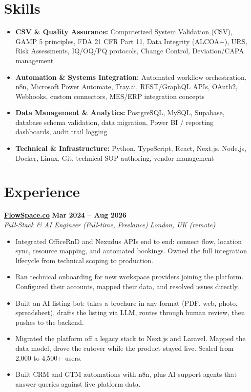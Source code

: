 \documentclass[a4paper,10pt]{article}
\newcommand{\role}[4]{%
 \textbf{#1} \hfill \textbf{#2}\\[1pt]%
 \textit{#3} \hfill \textit{#4}\\[2pt]%
}
\begin{document}
\section{Skills}
\begin{itemize}
 \item \textbf{CSV \& Quality Assurance:} Computerized System Validation (CSV), GAMP 5 principles, FDA 21 CFR Part 11, Data Integrity (ALCOA+), URS, Risk Assessments, IQ/OQ/PQ protocols, Change Control, Deviation/CAPA management
 \item \textbf{Automation \& Systems Integration:} Automated workflow orchestration, n8n, Microsoft Power Automate, Tray.ai, REST/GraphQL APIs, OAuth2, Webhooks, custom connectors, MES/ERP integration concepts
 \item \textbf{Data Management \& Analytics:} PostgreSQL, MySQL, Supabase, database schema validation, data migration, Power BI / reporting dashboards, audit trail logging
 \item \textbf{Technical \& Infrastructure:} Python, TypeScript, React, Next.js, Node.js, Docker, Linux, Git, technical SOP authoring, vendor management
\end{itemize}

\section{Experience}

\role{\href{https://flowspace.co}{FlowSpace.co}}{Mar 2024 -- Aug 2026}{Full-Stack \& AI Engineer (Full-time, Freelance)}{London, UK (remote)}
\begin{itemize}
 \item Integrated OfficeRnD and Nexudus APIs end to end: connect flow, location sync, resource mapping, and automated bookings. Owned the full integration lifecycle from technical scoping to production.
 \item Ran technical onboarding for new workspace providers joining the platform. Configured their accounts, mapped their data, and resolved issues directly.
 \item Built an AI listing bot: takes a brochure in any format (PDF, web, photo, spreadsheet), drafts the listing via LLM, routes through human review, then pushes to the backend.
 \item Migrated the platform off a legacy stack to Next.js and Laravel. Mapped the data model, drove the cutover while the product stayed live. Scaled from 2,000 to 4,500+ users.
 \item Built CRM and GTM automations with n8n, plus AI support agents that answer queries against live platform data.
\end{itemize}
\end{document}
